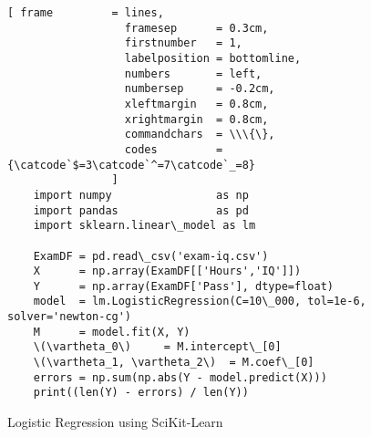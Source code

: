 \begin{figure}[!ht]
\centering
\begin{Verbatim}[ frame         = lines, 
                  framesep      = 0.3cm, 
                  firstnumber   = 1,
                  labelposition = bottomline,
                  numbers       = left,
                  numbersep     = -0.2cm,
                  xleftmargin   = 0.8cm,
                  xrightmargin  = 0.8cm,
                  commandchars  = \\\{\},
                  codes         = {\catcode`$=3\catcode`^=7\catcode`_=8}
                ]
    import numpy                as np
    import pandas               as pd
    import sklearn.linear\_model as lm
    
    ExamDF = pd.read\_csv('exam-iq.csv')
    X      = np.array(ExamDF[['Hours','IQ']])
    Y      = np.array(ExamDF['Pass'], dtype=float)
    model  = lm.LogisticRegression(C=10\_000, tol=1e-6, solver='newton-cg')
    M      = model.fit(X, Y)
    \(\vartheta_0\)     = M.intercept\_[0]
    \(\vartheta_1, \vartheta_2\)  = M.coef\_[0]
    errors = np.sum(np.abs(Y - model.predict(X)))
    print((len(Y) - errors) / len(Y))
\end{Verbatim}
\vspace*{-0.3cm}
\caption{Logistic Regression using SciKit-Learn}
\label{fig:Logistic-Regression-with-SciKit-Learn.ipynb}
\end{figure}
\FloatBarrier

